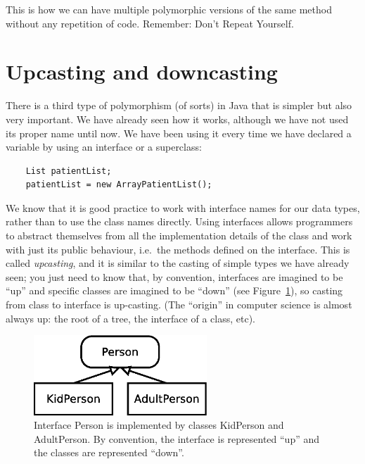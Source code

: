 This is how we can have multiple polymorphic versions of the same
method without any repetition of code. Remember: Don't Repeat
Yourself. 

\section{Upcasting and downcasting}
\label{sec:upcasting}

There is a third type of
polymorphism (of sorts) in Java that is simpler but also very
important. 
We have
already seen how it works, although we have not used its proper name
until now.
We have been using it every time we have declared
a variable by using an interface or a superclass: 

\begin{verbatim}
    List patientList;
    patientList = new ArrayPatientList();
\end{verbatim}

We know that it is good practice to work with interface names for our
data types, rather than to use the class names directly. Using interfaces
allows programmers to abstract themselves from all the implementation details
of the class and work with just its public behaviour, i.e.~the methods
defined on the interface. This is called \emph{upcasting}, and it is similar to the
casting of simple types we have already seen; you just need to know
that, by convention, interfaces are imagined to be ``up'' and specific
classes are imagined to be ``down'' (see Figure~\ref{fig:updown}), so casting from class to
interface is up-casting. (The ``origin'' in computer science is almost
always up: the root of a tree, the interface of a class, etc). 

\begin{figure}[hbtp]
  \centering
  \includegraphics[height=3cm]{gfx/class_diagram-person}
  \caption{Interface Person is implemented by classes KidPerson and
    AdultPerson. By convention, the interface is represented ``up'' and
    the classes are represented ``down''.} 
  \label{fig:updown}
\end{figure}

